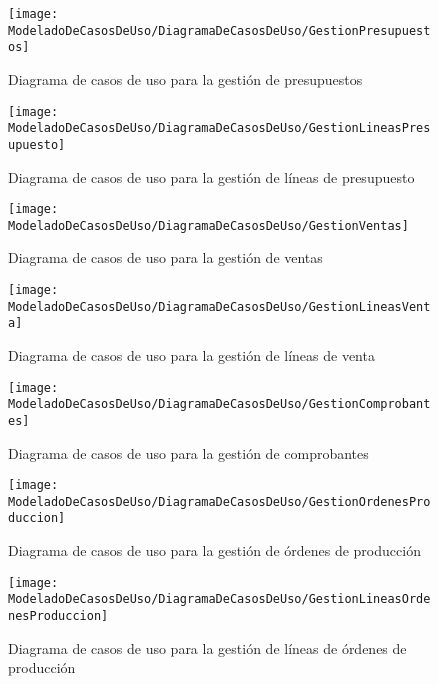     \begin{figure}[H]
		\centering
		\texttt{[image: ModeladoDeCasosDeUso/DiagramaDeCasosDeUso/GestionPresupuestos]}
		\caption{Diagrama de casos de uso para la gestión de presupuestos}
	\label{fig:GestionPresupuestos}
    \end{figure}
    \begin{figure}[H]
		\centering
		\texttt{[image: ModeladoDeCasosDeUso/DiagramaDeCasosDeUso/GestionLineasPresupuesto]}
		\caption{Diagrama de casos de uso para la gestión de líneas de presupuesto}
	\label{fig:GestionLineasPresupuesto}
    \end{figure}
    \begin{figure}[H]
		\centering
		\texttt{[image: ModeladoDeCasosDeUso/DiagramaDeCasosDeUso/GestionVentas]}
		\caption{Diagrama de casos de uso para la gestión de ventas}
	\label{fig:GestionVentas}
    \end{figure}
    \begin{figure}[H]
		\centering
		\texttt{[image: ModeladoDeCasosDeUso/DiagramaDeCasosDeUso/GestionLineasVenta]}
		\caption{Diagrama de casos de uso para la gestión de líneas de venta}
	\label{fig:GestionLineasVenta}
    \end{figure}
    \begin{figure}[H]
		\centering
		\texttt{[image: ModeladoDeCasosDeUso/DiagramaDeCasosDeUso/GestionComprobantes]}
		\caption{Diagrama de casos de uso para la gestión de comprobantes}
	\label{fig:GestionComprobantes}
    \end{figure}
    \begin{figure}[H]
		\centering
		\texttt{[image: ModeladoDeCasosDeUso/DiagramaDeCasosDeUso/GestionOrdenesProduccion]}
		\caption{Diagrama de casos de uso para la gestión de órdenes de producción}
	\label{fig:GestionOrdenesProduccion}
    \end{figure}
    \begin{figure}[H]
		\centering
		\texttt{[image: ModeladoDeCasosDeUso/DiagramaDeCasosDeUso/GestionLineasOrdenesProduccion]}
		\caption{Diagrama de casos de uso para la gestión de líneas de órdenes de producción}
	\label{fig:GestionLineasOrdenesProduccion}
    \end{figure}

